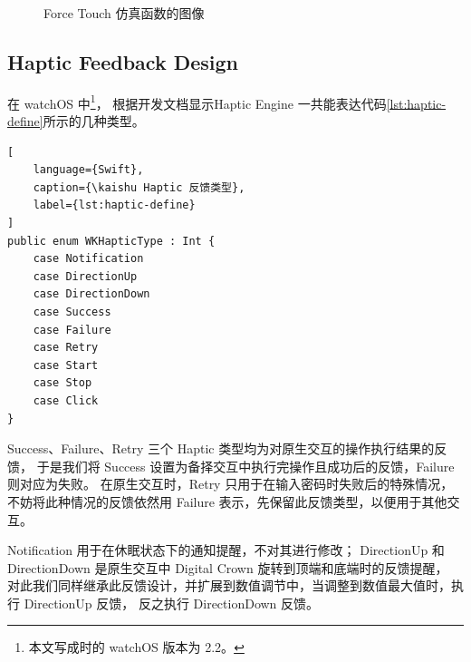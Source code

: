 \begin{figure}[htbp]
\centering
{}
\caption{Force Touch 仿真函数的图像}
\label{fig:ft-fig}

\end{figure}

\subsection{Haptic Feedback Design}
在 watchOS 中\footnote{本文写成时的 watchOS 版本为 2.2。}，
根据开发文档\cite{WatchGuide:2016}显示Haptic Engine 一共能表达代码\ref{lst:haptic-define}所示的几种类型。

\begin{lstlisting}[
    language={Swift},
    caption={\kaishu Haptic 反馈类型},
    label={lst:haptic-define}
]
public enum WKHapticType : Int {
    case Notification
    case DirectionUp
    case DirectionDown
    case Success
    case Failure
    case Retry
    case Start
    case Stop
    case Click
}
\end{lstlisting}

Success、Failure、Retry 三个 Haptic 类型均为对原生交互的操作执行结果的反馈，
于是我们将 Success 设置为备择交互中执行完操作且成功后的反馈，Failure 则对应为失败。
在原生交互时，Retry 只用于在输入密码时失败后的特殊情况，
不妨将此种情况的反馈依然用 Failure 表示，先保留此反馈类型，以便用于其他交互。

Notification 用于在休眠状态下的通知提醒，不对其进行修改；
DirectionUp 和 DirectionDown 是原生交互中 Digital Crown 旋转到顶端和底端时的反馈提醒，
对此我们同样继承此反馈设计，并扩展到数值调节中，当调整到数值最大值时，执行 DirectionUp 反馈，
反之执行 DirectionDown 反馈。

